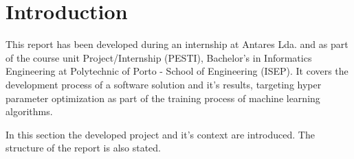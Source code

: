 
\section{Introduction}

This report has been developed during an internship at Antares Lda. and as part of the course unit Project/Internship (PESTI), Bachelor's in Informatics Engineering at Polytechnic of Porto - School of Engineering (ISEP). It covers the development process of a software solution and it's results, targeting hyper parameter optimization as part of the training process of machine learning algorithms.

In this section the developed project and it's context are introduced. The structure of the report is also stated.





